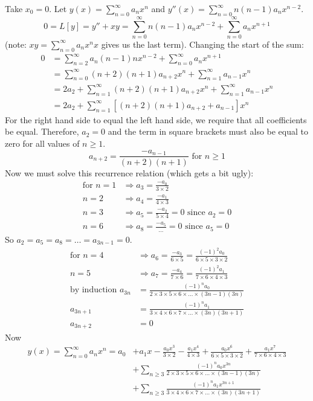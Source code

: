 \documentclass[11pt]{article}
\newcommand{\sumseries}{\sum_{n=0}^{\infty}}
\newcommand{\sumseriesone}{\sum_{n=1}^{\infty}}
\newcommand{\sumseriestwo}{\sum_{n=2}^{\infty}}
\begin{document}
	Take $x_0 = 0$. Let $y(x) = \sumseries a_n x^n$ and $y''(x) = \sumseries n (n-1) a_n x^{n-2}$.
		$$ 0 = L[y] = y'' + xy = \sumseries n (n-1) a_n x^{n-2} + \sumseries a_n x^{n+1} $$
	(note: $xy = \sumseries a_n x^n x$ gives us the last term). Changing the start of the sum:
		\begin{align*}
			0 &= \sumseriestwo a_n (n-1) n x^{n-2} + \sumseries a_n x^{n+1} \\
				&= \sumseries (n+2)(n+1) a_{n+2} x^n + \sumseriesone a_{n-1} x^n \\
				&= 2 a_2 + \sumseriesone (n+2)(n+1) a_{n+2} x^n + \sumseriesone a_{n-1} x^n \\
				&= 2 a_2 + \sumseriesone [(n+2)(n+1) a_{n+2} + a_{n-1}] x^n
		\end{align*}
	For the right hand side to equal the left hand side, we require that all coefficients be equal. Therefore, $a_2 = 0$ and the term in square brackets must also be equal to zero for all values of $n \geq 1$.
		$$ \boxed{a_{n+2} = \frac{-a_{n-1}}{(n+2)(n+1)} \text{ for } n \geq 1} $$
	Now we must solve this recurrence relation (which gets a bit ugly):
		\begin{align*}
			\text{for } n=1 &\Rightarrow a_3 =\frac{- a_0}{3 \times 2} \\
				n=2 &\Rightarrow a_4 = \frac{- a_1}{4 \times 3} \\
				n=3 &\Rightarrow a_5 = \frac{- a_2}{5 \times 4} = 0 \text{ since } a_2 = 0 \\
				n=6 &\Rightarrow a_8 = \frac{- a_5}{\ldots} = 0 \text{ since } a_5 = 0
		\end{align*}
	So $a_2 = a_5 = a_8 = \ldots = a_{3n-1} = 0$.
		\begin{align*}
			\text{for } n = 4 &\Rightarrow a_6 = \frac{-a_3}{6 \times 5} = \frac{(-1)^2 a_0}{6 \times 5 \times 3 \times 2} \\
				n=5 &\Rightarrow a_7 = \frac{-a_4}{7 \times 6} = \frac{(-1)^2 a_1}{7 \times 6 \times 4 \times 3} \\
			\text{by induction } a_{3n} &= \frac{(-1)^n a_0}{2 \times 3 \times 5 \times 6 \times \ldots \times (3n-1)(3n)} \\
				a_{3n+1} &= \frac{(-1)^n a_1}{3 \times 4 \times 6 \times 7 \times \ldots \times (3n)(3n+1)} \\
				a_{3n+2} &= 0
		\end{align*}
	Now
		\begin{align*} y(x) = \sumseries a_n x^n = a_0 &+ a_1 x - \frac{a_0 x^3}{3\times2} - \frac{a_1 x^4}{4\times3} + \frac{a_0 x^6}{6\times5\times3\times2} + \frac{a_1 x^7}{7\times6\times4\times3} \\
			&+ \sum_{n \geq 3} \frac{(-1)^n a_0 x^{3n}}{2 \times 3 \times 5 \times 6 \times \ldots \times (3n-1)(3n)} \\
			&+ \sum_{n\geq3} \frac{(-1)^n a_1 x^{3n+1}}{3 \times 4 \times 6 \times 7 \times \ldots \times (3n)(3n+1)} \\
		\end{align*}
\end{document}
